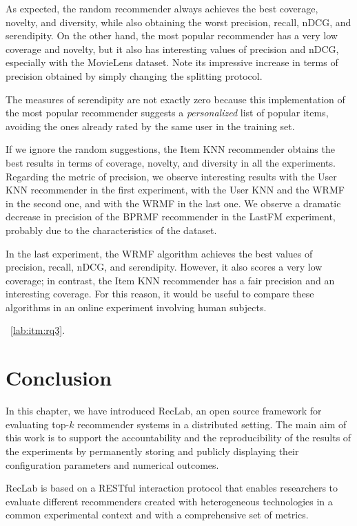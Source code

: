 As expected, the random recommender always achieves the best coverage, novelty, and diversity, while also obtaining the worst precision, recall, nDCG, and serendipity. On the other hand, the most popular recommender has a very low coverage and novelty, but it also has interesting values of precision and nDCG, especially with the MovieLens dataset. Note its impressive increase in terms of precision obtained by simply changing the splitting protocol.

The measures of serendipity are not exactly zero because this implementation of the most popular recommender suggests a \emph{personalized} list of popular items, avoiding the ones already rated by the same user in the training set.

If we ignore the random suggestions, the Item KNN recommender obtains the best results in terms of coverage, novelty, and diversity in all the experiments. Regarding the metric of precision, we observe interesting results with the User KNN recommender in the first experiment, with the User KNN and the WRMF in the second one, and with the WRMF in the last one. We observe a dramatic decrease in precision of the BPRMF recommender in the LastFM experiment, probably due to the characteristics of the dataset.

In the last experiment, the WRMF algorithm achieves the best values of precision, recall, nDCG, and serendipity. However, it also scores a very low coverage; in contrast, the Item KNN recommender has a fair precision and an interesting coverage. For this reason, it would be useful to compare these algorithms in an online experiment involving human subjects.

~\ref{lab:itm:rq3}.

\section{Conclusion}
\label{lab:sec:conclusion}

In this chapter, we have introduced RecLab, an open source framework for evaluating top-$k$ recommender systems in a distributed setting. The main aim of this work is to support the accountability and the reproducibility of the results of the experiments by permanently storing and publicly displaying their configuration parameters and numerical outcomes.

RecLab is based on a RESTful interaction protocol that enables researchers to evaluate different recommenders created with heterogeneous technologies in a common experimental context and with a comprehensive set of metrics.


